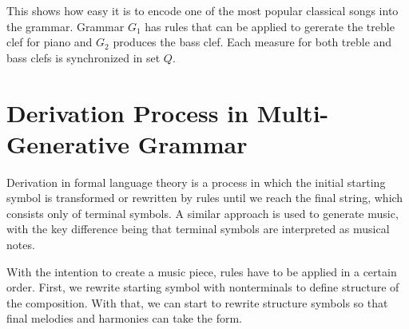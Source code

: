 This shows how easy it is to encode one of the most popular classical songs into the grammar. Grammar $G_1$ has rules that can be applied to gererate the treble clef for piano and $G_2$ produces the bass clef. Each measure for both treble and bass clefs is synchronized in set $Q$.

\section{Derivation Process in Multi-Generative Grammar}
Derivation in formal language theory is a process in which the initial starting symbol is transformed or rewritten by rules until we reach the final string, which consists only of terminal symbols. A similar approach is used to generate music, with the key difference being that terminal symbols are interpreted as musical notes.

With the intention to create a music piece, rules have to be applied in a certain order. First, we rewrite starting symbol with nonterminals to define structure of the composition. With that, we can start to rewrite structure symbols so that final melodies and harmonies can take the form. 

